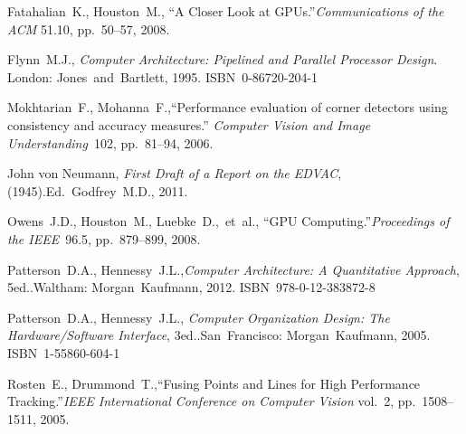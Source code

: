 {\raggedright
	\begin{thebibliography}{99}
		
			Fatahalian~K., Houston~M.,
			``A Closer Look at GPUs.''\linebreak[1]
			\textit{Communications of the ACM} 51.10, pp.~50--57, 2008.
		
			Flynn~M.J.,
			\textit{Computer Architecture: Pipelined and Parallel Processor Design}.
			\linebreak[3]
			London: Jones~and~Bartlett, 1995. ISBN~0-86720-204-1
		
			Mokhtarian~F., Mohanna~F.,\linebreak[1]
			``Performance evaluation of corner detectors using
			consistency and accuracy measures.''
			\textit{Computer Vision and Image Understanding}~102, pp.~81--94, 2006.
		
			John von Neumann,
			\textit{First Draft of a Report on the EDVAC}, (1945).\linebreak[2]
			Ed.~Godfrey~M.D., 2011.
		
			Owens~J.D., Houston~M., Luebke~D.,~et~al.,
			``GPU Computing.''\linebreak[1]
			\textit{Proceedings of the IEEE}~96.5, pp.~879--899,
			2008.
		
			Patterson~D.A., Hennessy~J.L.,\linebreak[1]
			\textit{Computer Architecture: A Quantitative Approach},
				5\nth ed..\linebreak[1]
			Waltham: Morgan~Kaufmann, 2012. ISBN~978-0-12-383872-8
		
			Patterson~D.A., Hennessy~J.L., \linebreak[1]
			\textit{Computer Organization Design: %
				The Hardware/Software Interface}, 3\rd ed..\linebreak[1]
			San~Francisco: Morgan~Kaufmann, 2005. ISBN~1-55860-604-1
		
			Rosten~E., Drummond~T.,\linebreak[1]
			``Fusing Points and Lines for High Performance Tracking.''\linebreak[1]
			\textit{IEEE International Conference on Computer Vision} vol.~2,
			pp.~1508--1511, 2005.
		

\end{thebibliography}}
